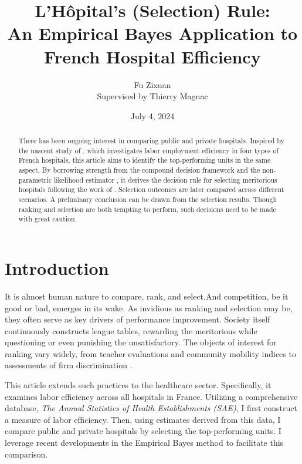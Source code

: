 \documentclass[12pt]{article}
\title{L'Hôpital's (Selection) Rule:\\{\large {An Empirical Bayes Application to French Hospital Efficiency}}}
\author{Fu Zixuan \\{\small {Supervised by Thierry Magnac}}}
\date{July 4, 2024}
\begin{document}
\maketitle
\thispagestyle{empty}
\begin{abstract}
    \noindent  There has been ongoing interest in comparing public and private hospitals. Inspired by the nascent study of \citet{croiset2024hospitals}, which investigates labor employment efficiency in four types of French hospitals, this article aims to identify the top-performing units in the same aspect. By borrowing strength from the compound decision framework and the non-parametric likelihood estimator \citep{kiefer1956consistency}, it derives the decision rule for selecting meritorious hospitals following the work of \citet{gu2023invidious}. Selection outcomes are later compared across different scenarios. A preliminary conclusion can be drawn from the selection results. Though ranking and selection are both tempting to perform, such decisions need to be made with great caution.\\


    \bigskip
\end{abstract}

\newpage
\thispagestyle{empty}
\tableofcontents
\newpage

\setcounter{page}{1}
\section{Introduction}

It is almost human nature to compare, rank, and select.And competition, be it
good or bad, emerges in its wake. As invidious as ranking and selection may be,
they often serve as key drivers of performance improvement. Society itself
continuously constructs league tables, rewarding the meritorious while
questioning or even punishing the unsatisfactory. The objects of interest for
ranking vary widely, from teacher evaluations \citep{chetty2014measuring} and
community mobility indices \citep{chetty2018impacts} to assessments of firm
discrimination \citep{kline2022systemic}.

This article extends such practices to the healthcare sector. Specifically, it
examines labor efficiency across all hospitals in France. Utilizing a
comprehensive database, \textit{The Annual Statistics of Health Establishments
    (SAE)}, I first construct a measure of labor efficiency. Then, using estimates
derived from this data, I compare public and private hospitals by selecting the
top-performing units. I leverage recent developments in the Empirical Bayes
method to facilitate this comparison.
\end{document}
